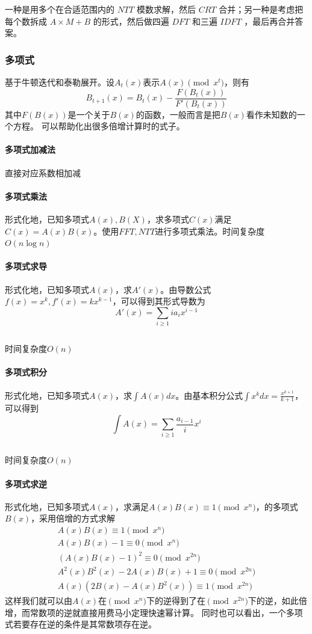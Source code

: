 \documentclass[UTF-8]{ctexart}
\newcommand{\cpp}[1]{\inputminted[bgcolor=bg,breaklines,breakanywhere=true]{c++}{#1}}
\begin{document}
			一种是用多个在合适范围内的 $NTT$ 模数求解，然后 $CRT$ 合并；另一种是考虑把每个数拆成 $A \times M+B$ 的形式，然后做四遍 $DFT$ 和三遍 $IDFT$ ，最后再合并答案。
			\subsubsection{多项式}
			基于牛顿迭代和泰勒展开。设$A _ t(x)$表示$A(x) \pmod{x^{t}}$，则有
			$$B _ {t+1}(x)=B _ t(x)-\frac{F(B _ t(x))}{F'(B _ t(x))}$$
			其中$F(B(x))$是一个关于$B(x)$的函数，一般而言是把$B(x)$看作未知数的一个方程。  
			可以帮助化出很多倍增计算时的式子。
			\paragraph{多项式加减法} 直接对应系数相加减
			\paragraph{多项式乘法} 形式化地，已知多项式$A(x),B(X)$，求多项式$C(x)$满足$C(x)=A(x)B(x)$。使用$FFT,NTT$进行多项式乘法。时间复杂度$O(n\log n)$
			\paragraph{多项式求导}形式化地，已知多项式$A(x)$，求$A'(x)$。由导数公式$f(x)=x^k,f'(x)=kx^{k-1}$，可以得到其形式导数为
			$$A'(x)=\sum _ {i \ge 1}ia _ {i}x^{i-1}$$
			\cpp{code//Math//polydery.cpp}
			时间复杂度$O(n)$
			\paragraph{多项式积分}形式化地，已知多项式$A(x)$，求$\int A(x)dx$。由基本积分公式$\int x^kdx=\frac{x^{k+1}}{k+1}$，可以得到
			$$\int A(x)=\sum _ {i \ge 1}\frac{a _ {i-1}}{i}x^i$$
			\cpp{code//Math//polyinte.cpp}
			时间复杂度$O(n)$
			\paragraph{多项式求逆}形式化地，已知多项式$A(x)$，求满足$A(x)B(x) \equiv 1 \pmod {x^n} $，的多项式$B(x)$，采用倍增的方式求解
			\begin{align}
			A(x)B(x) \equiv 1 \pmod{x^n} \nonumber\\ A(x)B(x)-1 \equiv 0 \pmod{x^n} \nonumber\\ (A(x)B(x)-1)^2 \equiv 0 \pmod {x^{2n}} \nonumber\\ A^2(x)B^2(x)-2A(x)B(x)+1 \equiv 0 \pmod{x^{2n}} \nonumber\\ A(x)(2B(x)-A(x)B^2(x)) \equiv 1 \pmod {x^{2n}}\nonumber
			\end{align}
			这样我们就可以由$A(x)$在$\pmod{x^n}$下的逆得到了在$\pmod{x^{2n}}$下的逆，如此倍增，而常数项的逆就直接用费马小定理快速幂计算。  
			同时也可以看出，一个多项式若要存在逆的条件是其常数项存在逆。
			
\end{document}
